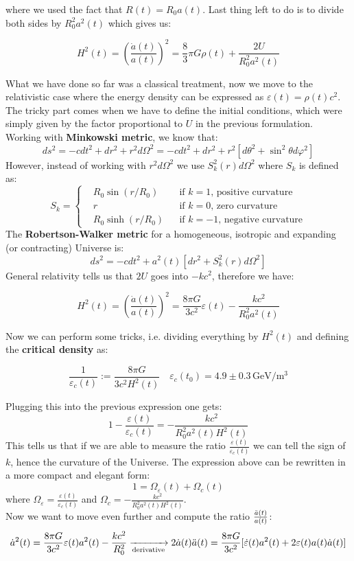 \documentclass[10.75pt,a4paper,openright,bottom=2cm]{article}
\newcommand{\beginbox}[1]{\begin{tcolorbox}[width=\textwidth,colback={black!40},title={#1},colbacktitle={purple!55},coltitle=black]}
\renewcommand{\endbox}{\end{tcolorbox}\noindent}
\begin{document}
where we used the fact that $R(t)=R_0a(t)$. Last thing left to do is to divide both sides by $R_0^2a^2(t)$ which gives us:
\beginbox{Friedmann Equation (classical derivation)}
\[
H^2(t)=\left(\frac{\Dot{a}(t)}{a(t)}\right)^2=\frac{8}{3}\pi G\rho(t)+\frac{2U}{R_0^2a^2(t)}
\]
\endbox
What we have done so far was a classical treatment, now we move to the relativistic case where the energy density can be expressed as $\varepsilon(t)=\rho(t)c^2$. The tricky part comes when we have to define the initial conditions, which were simply given by the factor proportional to $U$ in the previous formulation. Working with \textbf{Minkowski metric}, we know that:
\[
ds^2=-cdt^2+dr^2+r^2d\Omega^2=-cdt^2+dr^2+r^2[d\theta^2+\sin^2\theta d\varphi^2]
\]
However, instead of working with $r^2d\Omega^2$ we use $S_k^2(r)d\Omega^2$ where $S_k$ is defined as:
\[
S_k=\left\{\begin{aligned}
&R_0\sin(r/R_0) &&\text{if $k=1$, positive curvature}\\
&r &&\text{if $k=0$, zero curvature}\\
&R_0\sinh(r/R_0) &&\text{if $k=-1$, negative curvature}
\end{aligned}\right.
\]
The \textbf{Robertson-Walker metric} for a homogeneous, isotropic and expanding (or contracting) Universe is:
\[
ds^2=-cdt^2+a^2(t)[dr^2+S_k^2(r)d\Omega^2]
\]
General relativity tells us that $2U$ goes into $-kc^2$, therefore we have:
\beginbox{Friedmann Equation (relativistic version)}
\[
H^2(t)=\left(\frac{\Dot{a}(t)}{a(t)}\right)^2=\frac{8\pi G}{3c^2}\varepsilon(t)-\frac{kc^2}{R_0^2a^2(t)}
\]
\endbox
Now we can perform some tricks, i.e. dividing everything by $H^2(t)$ and defining the \textbf{critical density} as:
\beginbox{Critical Energy Density}
\[
\frac{1}{\varepsilon_c(t)}:=\frac{8\pi G}{3c^2H^2(t)} \quad \varepsilon_c(t_0)=4.9\pm0.3\,\text{GeV/m$^3$}
\]
\endbox
Plugging this into the previous expression one gets:
\[
1-\frac{\varepsilon(t)}{\varepsilon_c(t)}=-\frac{kc^2}{R_0^2a^2(t)H^2(t)}
\]
This tells us that if we are able to measure the ratio $\frac{\varepsilon(t)}{\varepsilon_c(t)}$ we can tell the sign of $k$, hence the curvature of the Universe. The expression above can be rewritten in a more compact and elegant form:
\[
1=\Omega_\varepsilon(t)+\Omega_c(t)
\]
where $\Omega_\varepsilon=\frac{\varepsilon(t)}{\varepsilon_c(t)}$ and $\Omega_c=-\frac{kc^2}{R_0^2a^2(t)H^2(t)}$.\\
Now we want to move even further and compute the ratio $\frac{\Ddot{a}(t)}{a(t)}$:
\[
\Dot{a}^2(t)=\frac{8\pi G}{3c^2}\varepsilon(t)a^2(t)-\frac{kc^2}{R_0^2}\xrightarrow[\text{derivative}]{}2\Dot{a}(t)\Ddot{a}(t)=\frac{8\pi G}{3c^2}[\Dot{\varepsilon}(t)a^2(t)+2\varepsilon(t)a(t)\Dot{a}(t)]
\]
\end{document}
